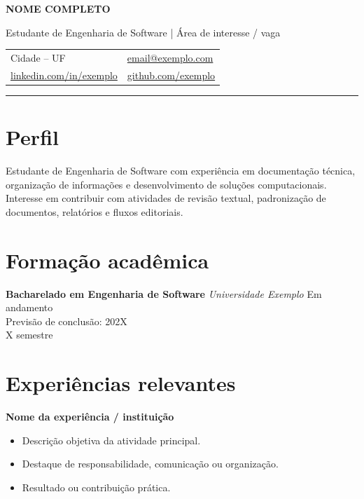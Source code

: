 \documentclass[10pt,a4paper]{article}
\newcommand{\cvitem}[2]{\textbf{#1} #2\par}
\begin{document}
\color{textgray}

{\LARGE \textbf{NOME COMPLETO}}\par
\vspace{2pt}
{\large \textcolor{accent}{Estudante de Engenharia de Software | Área de interesse / vaga}}\par
\vspace{6pt}

\begin{tabularx}{\textwidth}{X X}
Cidade -- UF & \href{mailto:email@exemplo.com}{email@exemplo.com} \\
\href{https://www.linkedin.com/in/exemplo}{linkedin.com/in/exemplo} & \href{https://github.com/exemplo}{github.com/exemplo} \\
\end{tabularx}

\vspace{2pt}
\hrule
\vspace{8pt}

\section*{Perfil}
Estudante de Engenharia de Software com experiência em documentação técnica, organização de informações e desenvolvimento de soluções computacionais. Interesse em contribuir com atividades de revisão textual, padronização de documentos, relatórios e fluxos editoriais.

\section*{Formação acadêmica}
\cvitem{Bacharelado em Engenharia de Software}{\textit{Universidade Exemplo} \hfill Em andamento \\
Previsão de conclusão: 202X \\
X\textdegree{} semestre}

\section*{Experiências relevantes}

\textbf{Nome da experiência / instituição}
\begin{itemize}
    \item Descrição objetiva da atividade principal.
    \item Destaque de responsabilidade, comunicação ou organização.
    \item Resultado ou contribuição prática.
\end{itemize}
\end{document}
